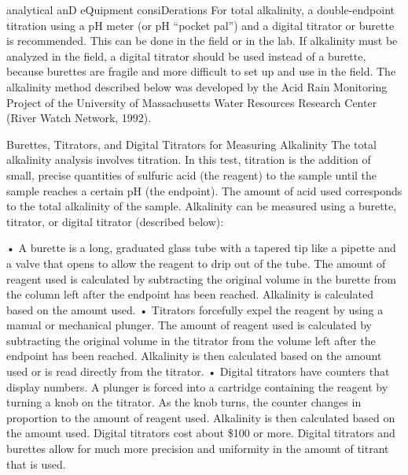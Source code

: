 \documentclass{article}
\begin{document}
analytical anD eQuipment consiDerations For total alkalinity, a
double-endpoint titration using a pH meter (or pH ``pocket pal'') and a
digital titrator or burette is recommended. This can be done in the
field or in the lab. If alkalinity must be analyzed in the field, a
digital titrator should be used instead of a burette, because burettes
are fragile and more difficult to set up and use in the field. The
alkalinity method described below was developed by the Acid Rain
Monitoring Project of the University of Massachusetts Water Resources
Research Center (River Watch Network, 1992).

Burettes, Titrators, and Digital Titrators for Measuring Alkalinity The
total alkalinity analysis involves titration. In this test, titration is
the addition of small, precise quantities of sulfuric acid (the reagent)
to the sample until the sample reaches a certain pH (the endpoint). The
amount of acid used corresponds to the total alkalinity of the sample.
Alkalinity can be measured using a burette, titrator, or digital
titrator (described below):

• A burette is a long, graduated glass tube with a tapered tip like a
pipette and a valve that opens to allow the reagent to drip out of the
tube. The amount of reagent used is calculated by subtracting the
original volume in the burette from the column left after the endpoint
has been reached. Alkalinity is calculated based on the amount used. •
Titrators forcefully expel the reagent by using a manual or mechanical
plunger. The amount of reagent used is calculated by subtracting the
original volume in the titrator from the volume left after the endpoint
has been reached. Alkalinity is then calculated based on the amount used
or is read directly from the titrator. • Digital titrators have counters
that display numbers. A plunger is forced into a cartridge containing
the reagent by turning a knob on the titrator. As the knob turns, the
counter changes in proportion to the amount of reagent used. Alkalinity
is then calculated based on the amount used. Digital titrators cost
about \$100 or more. Digital titrators and burettes allow for much more
precision and uniformity in the amount of titrant that is used.
\end{document}
